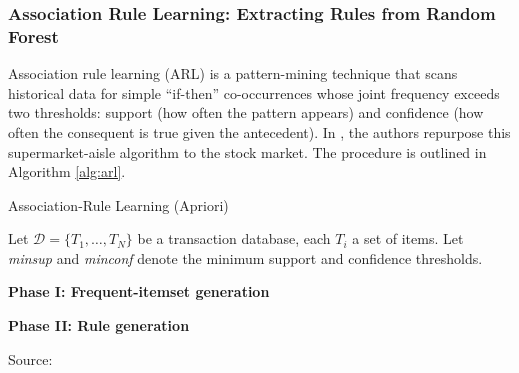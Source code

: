 \subsubsection{Association Rule Learning: Extracting Rules from Random Forest}
Association rule learning (ARL) is a pattern-mining technique that scans historical data for simple “if-then” co-occurrences whose joint frequency exceeds two thresholds: support (how often the pattern appears) and confidence (how often the consequent is true given the antecedent). In , the authors repurpose this supermarket-aisle algorithm to the stock market. The procedure is outlined in Algorithm \ref{alg:arl}.

\begin{algorithm}[H]
    \caption{Association-Rule Learning (Apriori)}
    \label{alg:arl_apriori}

    Let $\mathcal{D} = \{T_1,\ldots,T_N\}$ be a transaction database, each
    $T_i$ a set of items.  
    Let \textit{minsup} and \textit{minconf} denote the minimum support and confidence thresholds.

    \textbf{Phase I: Frequent-itemset generation}


    \vspace{4pt}
    \textbf{Phase II: Rule generation}


    Source: \cite{agrawal_1993}
\end{algorithm}


